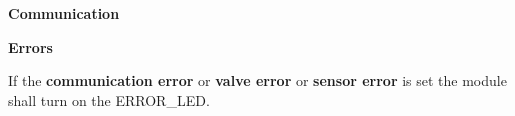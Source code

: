 \begin{req_enum}
		\item \textbf{Communication}
		\begin{req_enum}[label*=\arabic*.]
			\item 
		\end{req_enum}

		\item \textbf{Errors}
			\begin{req_enum}[label*=\arabic*.]
				\item If the \textbf{communication error} or \textbf{valve error} or \textbf{sensor error} is set the module shall turn on the ERROR\_LED.
			\end{req_enum}
		\end{req_enum}
